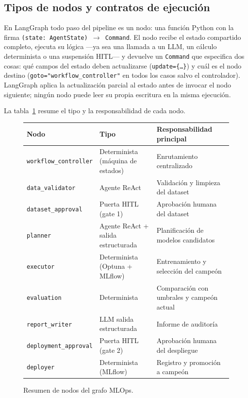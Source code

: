 \subsection{Tipos de nodos y contratos de ejecución}
\label{sec:nodos-contratos}

En LangGraph todo paso del pipeline es un nodo: una función Python con la firma
\texttt{(state: AgentState) $\to$ Command}.
El nodo recibe el estado compartido completo, ejecuta su lógica —ya sea una llamada a un LLM,
un cálculo determinista o una suspensión HITL— y devuelve un \texttt{Command} que especifica
dos cosas: qué campos del estado deben actualizarse (\texttt{update=\{\ldots\}}) y cuál es el nodo
destino (\texttt{goto="workflow\_controller"} en todos los casos salvo el controlador).
LangGraph aplica la actualización parcial al estado antes de invocar el nodo siguiente;
ningún nodo puede leer su propia escritura en la misma ejecución.

La tabla~\ref{tab:nodos-resumen} resume el tipo y la responsabilidad de cada nodo.

\begin{figure}[H]
\centering
\begin{tabular}{lll}
\hline
\textbf{Nodo} & \textbf{Tipo} & \textbf{Responsabilidad principal} \\
\hline
\texttt{workflow\_controller}   & Determinista (máquina de estados)  & Enrutamiento centralizado \\
\texttt{data\_validator}        & Agente ReAct                        & Validación y limpieza del dataset \\
\texttt{dataset\_approval}      & Puerta HITL (gate 1)                & Aprobación humana del dataset \\
\texttt{planner}                & Agente ReAct + salida estructurada  & Planificación de modelos candidatos \\
\texttt{executor}               & Determinista (Optuna + MLflow)      & Entrenamiento y selección del campeón \\
\texttt{evaluation}             & Determinista                        & Comparación con umbrales y campeón actual \\
\texttt{report\_writer}         & LLM salida estructurada             & Informe de auditoría \\
\texttt{deployment\_approval}   & Puerta HITL (gate 2)                & Aprobación humana del despliegue \\
\texttt{deployer}               & Determinista (MLflow)               & Registro y promoción a campeón \\
\hline
\end{tabular}
\caption{Resumen de nodos del grafo MLOps.}
\label{tab:nodos-resumen}
\end{figure}

